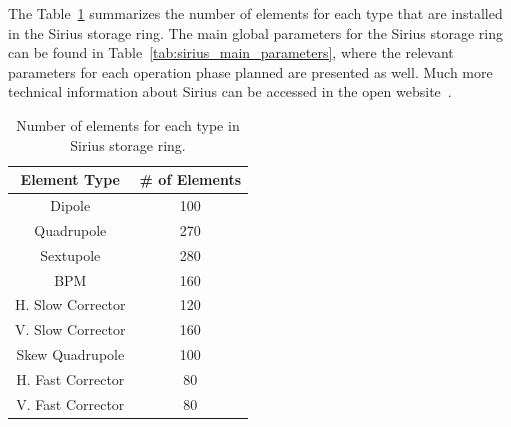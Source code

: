 The Table~\ref{tab:sirius_elements} summarizes the number of elements for each type that are installed in the Sirius storage ring. The main global parameters for the Sirius storage ring can be found in Table~\ref{tab:sirius_main_parameters}, where the relevant parameters for each operation phase planned are presented as well. Much more technical information about Sirius can be accessed in the open website~\cite{wiki}.
\begin{table}
        \centering
        \caption{Number of elements for each type in Sirius storage ring.}
        \label{tab:sirius_elements}
        \begin{tabular}{cc}
            \toprule\toprule
            Element Type & \# of Elements \\
            \hline
            Dipole              & 100 \\
            Quadrupole          & 270 \\
            Sextupole           & 280 \\
            BPM & 160 \\
            H. Slow Corrector & 120 \\
            V. Slow Corrector & 160 \\
            Skew Quadrupole & 100 \\
            H. Fast Corrector & 80 \\
            V. Fast Corrector & 80 \\
            \bottomrule\bottomrule
        \end{tabular}
\end{table}
